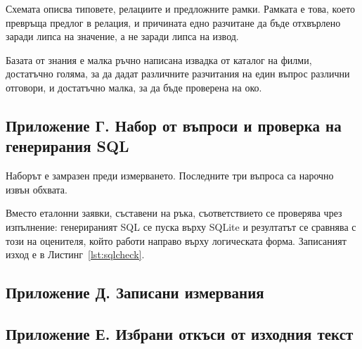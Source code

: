 Схемата описва типовете, релациите и предложните рамки. Рамката е това, което превръща
предлог в релация, и причината едно разчитане да бъде отхвърлено заради липса на значение,
а не заради липса на извод.



Базата от знания е малка ръчно написана извадка от каталог на филми, достатъчно голяма,
за да дадат различните разчитания на един въпрос различни отговори, и достатъчно малка,
за да бъде проверена на око.



\subsection*{Приложение Г. Набор от въпроси и проверка на генерирания SQL}

Наборът е замразен преди измерването. Последните три въпроса са нарочно извън обхвата.



Вместо еталонни заявки, съставени на ръка, съответствието се проверява чрез изпълнение:
генерираният SQL се пуска върху SQLite и резултатът се сравнява с този на оценителя, който
работи направо върху логическата форма. Записаният изход е в Листинг~\ref{lst:sqlcheck}.



\subsection*{Приложение Д. Записани измервания}



\subsection*{Приложение Е. Избрани откъси от изходния текст}

